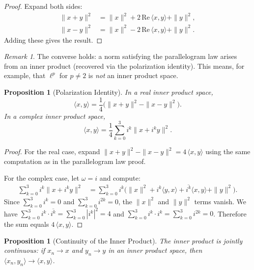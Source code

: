 \documentclass[11pt,a4paper]{article}
\theoremstyle{definition}
\theoremstyle{plain}
\newtheorem{proposition}[theorem]{Proposition}
\theoremstyle{remark}
\newtheorem{remark}{Remark}[section]
\begin{document}
\begin{proof}
Expand both sides:
\begin{align*}
    \|x + y\|^2 &= \|x\|^2 + 2\,\mathrm{Re}\,\langle x, y \rangle + \|y\|^2, \\
    \|x - y\|^2 &= \|x\|^2 - 2\,\mathrm{Re}\,\langle x, y \rangle + \|y\|^2.
\end{align*}
Adding these gives the result.
\end{proof}

\begin{remark}\label{rem:parallelogram-converse}
The converse holds: a norm satisfying the parallelogram law arises from an inner
product (recovered via the polarization identity). This means, for example,
that $\ell^p$ for $p \neq 2$ is \emph{not} an inner product space.
\end{remark}

\begin{proposition}[Polarization Identity]\label{prop:polarization}
In a real inner product space,
\[
    \langle x, y \rangle
    = \frac{1}{4}\bigl(\|x+y\|^2 - \|x-y\|^2\bigr).
\]
In a complex inner product space,
\[
    \langle x, y \rangle
    = \frac{1}{4}\sum_{k=0}^{3} i^k \|x + i^k y\|^2.
\]
\end{proposition}

\begin{proof}
For the real case, expand $\|x+y\|^2 - \|x-y\|^2 = 4\,\langle x, y \rangle$
using the same computation as in the parallelogram law proof.

For the complex case, let $\omega = i$ and compute:
\begin{align*}
    \sum_{k=0}^{3} i^k \|x + i^k y\|^2
    &= \sum_{k=0}^{3} i^k \bigl(\|x\|^2 + i^k \langle y, x \rangle
       + \overline{i^k} \langle x, y \rangle + \|y\|^2\bigr).
\end{align*}
Since $\sum_{k=0}^{3} i^k = 0$ and $\sum_{k=0}^{3} i^{2k} = 0$,
the $\|x\|^2$ and $\|y\|^2$ terms vanish. We have
$\sum_{k=0}^{3} i^k \cdot \overline{i^k} = \sum_{k=0}^{3} |i^k|^2 = 4$
and $\sum_{k=0}^{3} i^k \cdot i^k = \sum_{k=0}^{3} i^{2k} = 0$.
Therefore the sum equals $4\,\langle x, y \rangle$.
\end{proof}

\begin{proposition}[Continuity of the Inner Product]\label{prop:ip-continuity}
The inner product is jointly continuous: if $x_n \to x$ and $y_n \to y$ in an
inner product space, then $\langle x_n, y_n \rangle \to \langle x, y \rangle$.
\end{proposition}
\end{document}
